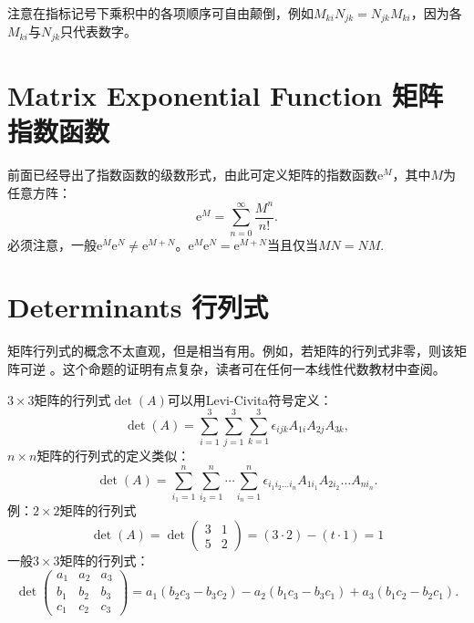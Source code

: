 注意在指标记号下乘积中的各项顺序可自由颠倒，例如$M_{ki} N_{jk} = N_{jk} M_{ki}$，因为各$M_{ki}$与$N_{jk}$只代表数字。


\section[矩阵指数函数]{Matrix Exponential Function 矩阵指数函数}
\label{sec.C.2}
前面已经导出了指数函数的级数形式，由此可定义矩阵的指数函数$\mathrm{e}^M$，其中$M$为任意方阵：
\begin{equation}
\label{equC.4}
	\mathrm{e}^M = \sum_{n = 0}^\infty \frac{M^n}{n!}.
\end{equation}
必须注意，一般$\mathrm{e}^M \mathrm{e}^N \neq \mathrm{e}^{M + N}$。$\mathrm{e}^M \mathrm{e}^N = \mathrm{e}^{M + N}$当且仅当$MN = NM$.

\section[行列式]{Determinants 行列式}
\label{sec.C.3}
矩阵行列式的概念不太直观，但是相当有用。例如，若矩阵的行列式非零，则该矩阵可逆%
%
。这个命题的证明有点复杂，读者可在任何一本线性代数教材中查阅。

$3 \times 3$矩阵的行列式$\det (A)$可以用Levi-Civita符号定义：
\begin{equation}
\label{equC.5}
	\det (A) = \sum_{i = 1}^3 \sum_{j = 1}^3 \sum_{k = 1}^3 \epsilon_{ijk} A_{1i} A_{2j} A_{3k},
\end{equation}
$n \times n$矩阵的行列式的定义类似：
\begin{equation}
\label{equC.6}
	\det (A) = \sum_{i_1 = 1}^n \sum_{i_2 = 1}^n \cdots \sum_{i_n = 1}^n \epsilon_{i_1 i_2 \dots i_n} A_{1 i_1} A_{2 i_2} \dots A_{n i_n}.
\end{equation}
例：$2 \times 2$矩阵的行列式
\[
	\det (A) = \det
		\begin{pmatrix}
			3 & 1 \\
			5 & 2
		\end{pmatrix}
	= (3 \cdot 2) - (t \cdot 1) = 1
\]
一般$3 \times 3$矩阵的行列式：
\begin{equation}
\label{equC.7}
	\det
		\begin{pmatrix}
			a_1 & a_2 & a_3 \\
			b_1 & b_2 & b_3 \\
			c_1 & c_2 & c_3
		\end{pmatrix}
	= a_1 (b_2 c_3 - b_3 c_2) - a_2 (b_1 c_3 - b_3 c_1) + a_3 (b_1 c_2 - b_2 c_1).
\end{equation}


